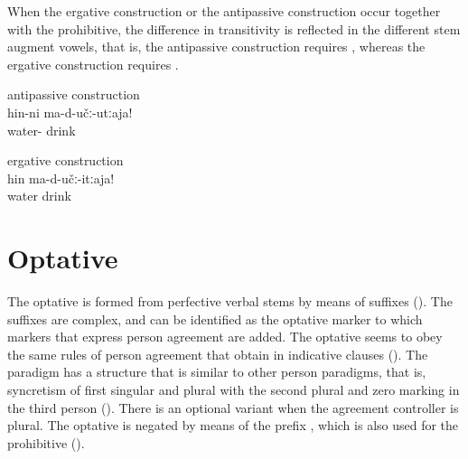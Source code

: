 When the ergative construction or the antipassive construction occur together with the prohibitive, the difference in transitivity is reflected in the different stem augment vowels, that is, the antipassive construction requires  , whereas the ergative construction requires  .
%
\begin{exe}
	\ex
	\begin{xlist}
		\ex	\label{ex:Do not drink water (regularly)}
		antipassive construction\\
		\gll	hin-ni	ma-d-učː-utːaja!\\
			water-	drink\\
		\glt	{}
	
		\ex	\label{Do not drink the water}
		ergative construction\\
		\gll	hin	ma-d-učː-itːaja!\\
			water	drink\\
		\glt	{}
	\end{xlist}
\end{exe}



\section{Optative}
\label{sec:optative}

The optative is formed from perfective verbal stems by means of suffixes (). The suffixes are complex, and  can be identified as the optative marker to which markers that express person agreement are added. The optative seems to obey the same rules of person agreement that obtain in indicative clauses (). The paradigm has a structure that is similar to other person paradigms, that is, syncretism of first singular and plural with the second plural and zero marking in the third person (). There is an optional variant  when the agreement controller is plural. The optative is negated by means of the prefix , which is also used for the prohibitive ().

